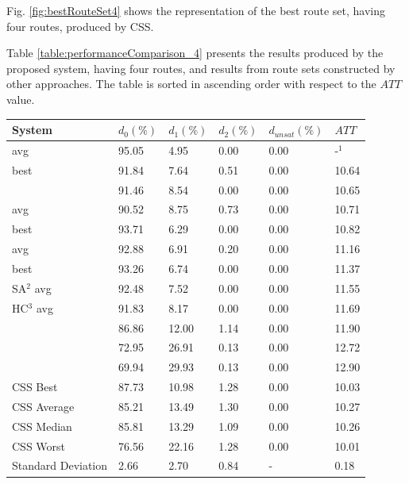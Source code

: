Fig. \vref{fig:bestRouteSet4} shows the representation of the best route set, having four routes, produced by CSS.

Table \vref{table:performanceComparison_4} presents the results produced by the proposed system, having four routes, and results from route sets constructed by other approaches. The table is sorted in ascending order with respect to the $ATT$value.

\begin{table}[H]
	\centering
    \hspace*{-1.0cm}
    \begin{tabular}{|l|l|l|l|l|l|}
 	\hline
 	\textbf{System} & $d_0(\%)$ & $d_1(\%)$ & $d_2(\%)$ & $d_{unsat}(\%)$ & $ATT$ \\
 	\hline
    \citet{nikolic14} avg & 95.05 & 4.95 & 0.00 & 0.00 & -$^1$ \\
    \citet{kechagiopoulos14} best & 91.84 & 7.64 & 0.51 & 0.00 & 10.64 \\
    \citet{zhang10} & 91.46 & 8.54 & 0.00 & 0.00 & 10.65 \\
    \citet{kechagiopoulos14} avg & 90.52 & 8.75 & 0.73 & 0.00 & 10.71 \\
    \citet{chew12} best & 93.71 & 6.29 & 0.00 & 0.00 & 10.82 \\
    \citet{chew12} avg & 92.88 & 6.91 & 0.20 & 0.00 & 11.16 \\
    \citet{fan10} best & 93.26 & 6.74 & 0.00 & 0.00 & 11.37 \\
    \citet{fan10} SA$^2$ avg & 92.48 & 7.52 & 0.00 & 0.00 & 11.55 \\
    \citet{fan10} HC$^3$ avg & 91.83 & 8.17 & 0.00 & 0.00 & 11.69 \\
    \citet{chakroborty02} & 86.86 & 12.00 & 1.14 & 0.00 & 11.90 \\
    \citet{kidwai98} & 72.95 & 26.91 & 0.13 & 0.00 & 12.72 \\
    \citet{mandl79} & 69.94 & 29.93 & 0.13 & 0.00 & 12.90 \\
    \hline
    CSS Best & 87.73 & 10.98 & 1.28 & 0.00 & 10.03\\
    CSS Average & 85.21 & 13.49 & 1.30 & 0.00 & 10.27\\
    CSS Median & 85.81 & 13.29 & 1.09 & 0.00 & 10.26\\
    CSS Worst & 76.56 & 22.16 & 1.28 & 0.00 & 10.01\\
    Standard Deviation & 2.66 & 2.70 & 0.84 & - & 0.18\\

\end{tabular}
\end{table}

